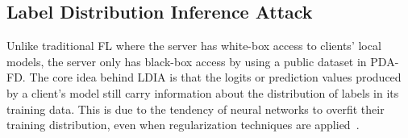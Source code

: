 
\subsection{Label Distribution Inference Attack}
\label{sec:ldia_method}
Unlike traditional FL where the server has white-box access to clients' local models, the server only has black-box access by using a public dataset in PDA-FD.
The core idea behind LDIA is that the logits or prediction values produced by a client's model still carry information about the distribution of labels in its training data.
This is due to the tendency of neural networks to overfit their training distribution, even when regularization techniques are applied~\cite{yeom2018privacy}.


